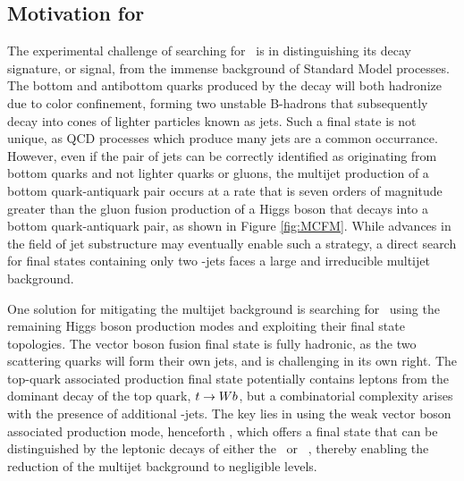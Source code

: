 \subsection{Motivation for \VHbb}

The experimental challenge of searching for \Hbb\ is in distinguishing its decay signature, or signal, from the immense background of Standard Model processes. The bottom and antibottom quarks produced by the decay will both hadronize due to color confinement, forming two unstable B-hadrons that subsequently decay into cones of lighter particles known as jets. Such a final state is not unique, as QCD processes which produce many jets are a common occurrance. However, even if the pair of jets can be correctly identified as originating from bottom quarks and not lighter quarks or gluons, the multijet production of a bottom quark-antiquark pair occurs at a rate that is seven orders of magnitude greater than the gluon fusion production of a Higgs boson that decays into a bottom quark-antiquark pair, as shown in Figure \ref{fig:MCFM}. While advances in the field of jet substructure may eventually enable such a strategy\cite{ggHbb}, a direct search for final states containing only two \qrkb-jets faces a large and irreducible multijet background.

One solution for mitigating the multijet background is searching for \Hbb\ using the remaining Higgs boson production modes and exploiting their final state topologies. The vector boson fusion final state is fully hadronic, as the two scattering quarks will form their own jets, and is challenging in its own right. The top-quark associated production final state potentially contains leptons from the dominant decay of the top quark, $t \rightarrow Wb$, but a combinatorial complexity arises with the presence of additional \qrkb-jets. The key lies in using the weak vector boson associated production mode, henceforth \VHbb, which offers a final state that can be distinguished by the leptonic decays of either the \bosW\ or \bosZ\ , thereby enabling the reduction of the multijet background to negligible levels.

